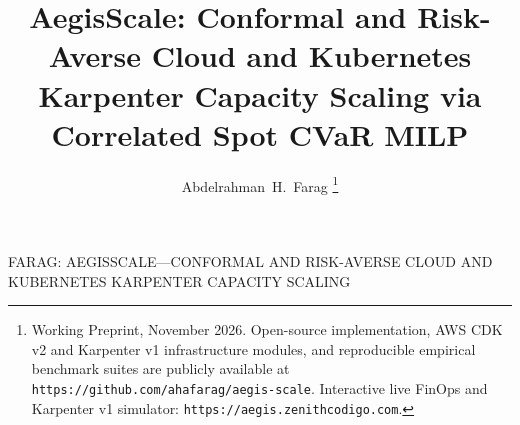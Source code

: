\documentclass[journal]{IEEEtran}
\begin{document}
\sloppy

\title{AegisScale: Conformal and Risk-Averse Cloud and Kubernetes Karpenter Capacity Scaling via Correlated Spot CVaR MILP}

\author{Abdelrahman~H.~Farag%
\thanks{Working Preprint, November 2026. Open-source implementation, AWS CDK v2 and Karpenter v1 infrastructure modules, and reproducible empirical benchmark suites are publicly available at \texttt{https://github.com/ahafarag/aegis-scale}. Interactive live FinOps and Karpenter v1 simulator: \texttt{https://aegis.zenithcodigo.com}.}}

%
{FARAG: AEGISSCALE---CONFORMAL AND RISK-AVERSE CLOUD AND KUBERNETES KARPENTER CAPACITY SCALING}

\maketitle
\end{document}
